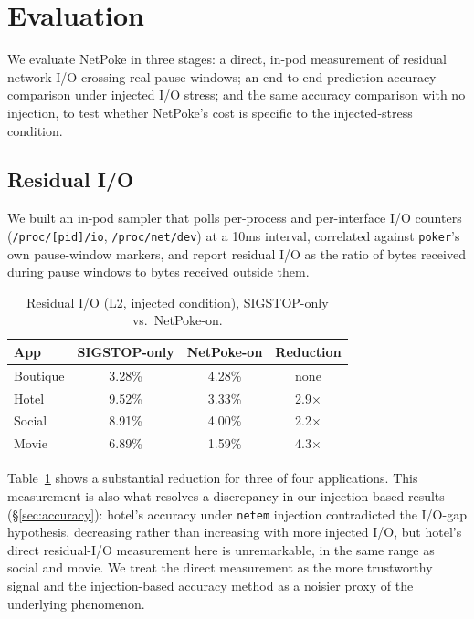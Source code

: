 \section{Evaluation}
\label{sec:evaluation}

We evaluate NetPoke in three stages: a direct, in-pod measurement of
residual network I/O crossing real pause windows; an end-to-end
prediction-accuracy comparison under injected I/O stress; and the same
accuracy comparison with no injection, to test whether NetPoke's cost is
specific to the injected-stress condition.

\subsection{Residual I/O}

We built an in-pod sampler that polls per-process and per-interface I/O
counters (\texttt{/proc/[pid]/io}, \texttt{/proc/net/dev}) at a
10ms interval, correlated against \texttt{poker}'s own pause-window
markers, and report residual I/O as the ratio of bytes received during
pause windows to bytes received outside them.

\begin{table}[t]
\centering
\small
\caption{Residual I/O (L2, injected condition), SIGSTOP-only vs.\ NetPoke-on.}
\label{tab:residual}
\begin{tabular}{lccc}
\toprule
App & SIGSTOP-only & NetPoke-on & Reduction \\
\midrule
Boutique & 3.28\% & 4.28\% & none \\
Hotel & 9.52\% & 3.33\% & 2.9$\times$ \\
Social & 8.91\% & 4.00\% & 2.2$\times$ \\
Movie & 6.89\% & 1.59\% & 4.3$\times$ \\
\bottomrule
\end{tabular}
\end{table}

Table~\ref{tab:residual} shows a substantial reduction for three of four
applications. This measurement is also what resolves a discrepancy in our
injection-based results (\S\ref{sec:accuracy}): hotel's accuracy under
\texttt{netem} injection contradicted the I/O-gap hypothesis, decreasing
rather than increasing with more injected I/O, but hotel's direct
residual-I/O measurement here is unremarkable, in the same range as social
and movie. We treat the direct measurement as the more trustworthy signal
and the injection-based accuracy method as a noisier proxy of the
underlying phenomenon.

